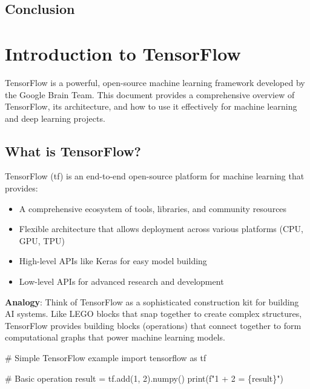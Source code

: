 \documentclass[
  letterpaper,
  DIV=11,
  numbers=noendperiod]{scrreprt}
\newenvironment{Shaded}{\begin{snugshade}}{\end{snugshade}}
\newcommand{\BuiltInTok}[1]{\textcolor[rgb]{0.00,0.23,0.31}{#1}}
\newcommand{\CommentTok}[1]{\textcolor[rgb]{0.37,0.37,0.37}{#1}}
\newcommand{\DecValTok}[1]{\textcolor[rgb]{0.68,0.00,0.00}{#1}}
\newcommand{\ImportTok}[1]{\textcolor[rgb]{0.00,0.46,0.62}{#1}}
\newcommand{\NormalTok}[1]{\textcolor[rgb]{0.00,0.23,0.31}{#1}}
\newcommand{\OperatorTok}[1]{\textcolor[rgb]{0.37,0.37,0.37}{#1}}
\newcommand{\SpecialCharTok}[1]{\textcolor[rgb]{0.37,0.37,0.37}{#1}}
\newcommand{\SpecialStringTok}[1]{\textcolor[rgb]{0.13,0.47,0.30}{#1}}
\providecommand{\tightlist}{%
  \setlength{\itemsep}{0pt}\setlength{\parskip}{0pt}}\usepackage{longtable,booktabs,array}
\begin{document}
\subsection{Conclusion}\label{conclusion-6}

\section{Introduction to TensorFlow}\label{introduction-to-tensorflow}

TensorFlow is a powerful, open-source machine learning framework
developed by the Google Brain Team. This document provides a
comprehensive overview of TensorFlow, its architecture, and how to use
it effectively for machine learning and deep learning projects.

\subsection{What is TensorFlow?}\label{what-is-tensorflow}

TensorFlow (tf) is an end-to-end open-source platform for machine
learning that provides:

\begin{itemize}
\tightlist
\item
  A comprehensive ecosystem of tools, libraries, and community resources
\item
  Flexible architecture that allows deployment across various platforms
  (CPU, GPU, TPU)
\item
  High-level APIs like Keras for easy model building
\item
  Low-level APIs for advanced research and development
\end{itemize}

\textbf{Analogy}: Think of TensorFlow as a sophisticated construction
kit for building AI systems. Like LEGO blocks that snap together to
create complex structures, TensorFlow provides building blocks
(operations) that connect together to form computational graphs that
power machine learning models.

\begin{Shaded}
\begin{Highlighting}[]
\CommentTok{\# Simple TensorFlow example}
\ImportTok{import}\NormalTok{ tensorflow }\ImportTok{as}\NormalTok{ tf}

\CommentTok{\# Basic operation}
\NormalTok{result }\OperatorTok{=}\NormalTok{ tf.add(}\DecValTok{1}\NormalTok{, }\DecValTok{2}\NormalTok{).numpy()}
\BuiltInTok{print}\NormalTok{(}\SpecialStringTok{f"1 + 2 = }\SpecialCharTok{\{}\NormalTok{result}\SpecialCharTok{\}}\SpecialStringTok{"}\NormalTok{)}
\end{Highlighting}
\end{Shaded}
\end{document}
